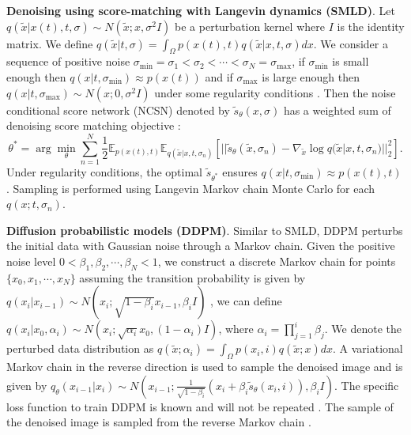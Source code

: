 \documentclass[]{interact}
\theoremstyle{plain}%
\theoremstyle{definition}
\theoremstyle{remark}
\begin{document}
\textbf{Denoising using score-matching with Langevin dynamics (SMLD)}.  Let $q(\tilde{x}|x(t),t,\sigma) \sim N(\tilde{x};x,\sigma^{2}I)$ be a perturbation kernel where $I$ is the identity matrix. We define $q(\tilde{x}|t,\sigma) = \int_{\Omega}p(x(t),t)q(\tilde{x}|x,t,\sigma)dx$. We consider a sequence of positive noise $\sigma_{\min} = \sigma_{1} < \sigma_{2} < \cdots < \sigma_{N} = \sigma_{\max}$, if $\sigma_{\min}$ is small enough then $q(x|t,\sigma_{\min}) \approx p(x(t))$ and if $\sigma_{\max}$ is large enough then $q(x|t,\sigma_{\max}) \sim N(x;0,\sigma^2 I)$ under some regularity conditions \cite{ysong-2019, ysong-2020-2}. Then the  noise conditional score network (NCSN) denoted by $\tilde{s}_{\theta}(x,\sigma)$ has a weighted sum of denoising score matching objective \cite{vincent-2011}:
\begin{equation}
    \theta^* = \arg\min\limits_{\theta} \sum_{n=1}^{N}\frac{1}{2} \mathbb{E}_{p(x(t),t)}\mathbb{E}_{q(\tilde{x}|x,t,\sigma_n)}[||\tilde{s}_{\theta}(\tilde{x},\sigma_n) - \nabla_{\tilde{x}}\log q(\tilde{x}|x,t,\sigma_{n})||_{2}^2].
\end{equation}
Under regularity conditions, the optimal $\tilde{s}_{\theta^*}$ ensures $q(x|t,\sigma_{\min}) \approx p(x(t),t)$ \cite{ysong-2020-2}. Sampling is performed using Langevin Markov chain Monte Carlo for each $q(x;t,\sigma_n)$.

\textbf{Diffusion probabilistic models (DDPM)}. Similar to SMLD, DDPM perturbs the initial data with Gaussian noise through a Markov chain. Given the positive noise level $0 < \beta_1, \beta_2,\cdots, \beta_N < 1$, we construct a discrete Markov chain for points $\{x_0, x_1, \cdots, x_N\}$ assuming the transition probability is given by $q(x_i|x_{i-1}) \sim N(x_i;\sqrt{1-\beta_i}x_{i-1}, \beta_i I)$ \cite{ho-2020}, we can define $q(x_i|x_0, \alpha_i) \sim N(x_i;\sqrt{\alpha_i}x_0, (1-\alpha_i)I)$, where $\alpha_i = \prod\limits_{j=1}^{i}\beta_j$. We denote the perturbed data distribution as $q(\tilde{x};\alpha_i) = \int_\Omega p(x_i,i)q(\tilde{x};x)dx$. A variational Markov chain in the reverse direction is used to sample the denoised image and is given by $q_\theta(x_{i-1}|x_i) \sim N(x_{i-1};\frac{1}{\sqrt{1-\beta_i}}(x_i + \beta_i \tilde{s}_\theta(x_i,i)),\beta_i I)$. The specific loss function to train DDPM is known and will not be repeated \cite{jsong-2020}. The sample of the denoised image is sampled from the reverse Markov chain \cite{ysong-2019}.
\end{document}
